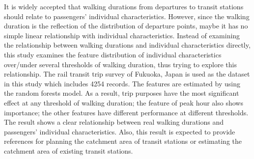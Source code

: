 \documentclass[12pt, twoside, a4paper]{book} %
\begin{document}
It is widely accepted that walking durations from departures to transit stations should relate to passengers' individual characteristics. However, since the walking duration is the reflection of the distribution of departure points, maybe it has no simple linear relationship with individual characteristics. Instead of examining the relationship between walking durations and individual characteristics directly, this study examines the feature distribution of individual characteristics over/under several thresholds of walking duration, thus trying to explore this relationship. The rail transit trip survey of Fukuoka, Japan is used as the dataset in this study which includes 4254 records. The features are estimated by using the random forests model. As a result, trip purposes have the most significant effect at any threshold of walking duration; the feature of peak hour also shows importance; the other features have different performance at different thresholds. The result shows a clear relationship between real walking durations and passengers' individual characteristics. Also, this result is expected to provide references for planning the catchment area of transit stations or estimating the catchment area of existing transit stations.

\mainmatter %











%
%

\backmatter
\setlength{\parskip}{0\baselineskip} %
\appendix

\end{document}
